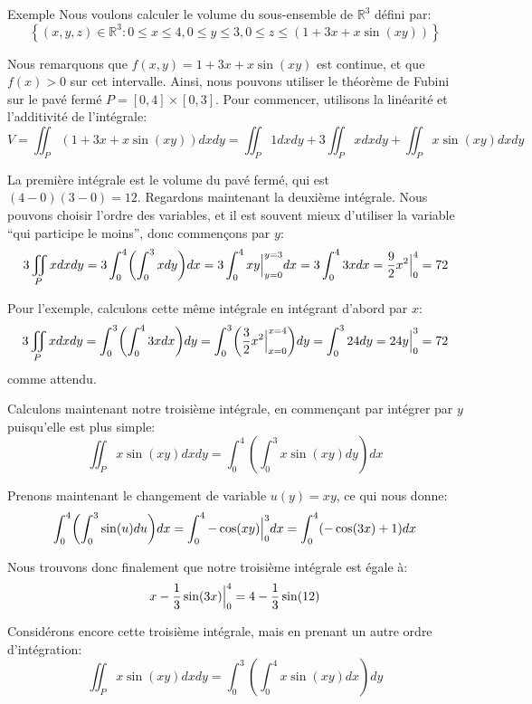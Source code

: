 \documentclass[a4paper]{article}
\begin{document}
\begin{parag}{Exemple}
    Nous voulons calculer le volume du sous-ensemble de $\mathbb{R}^3$ défini par: 
    \[\left\{\left(x, y, z\right) \in \mathbb{R}^3 : 0 \leq x \leq 4, 0 \leq y \leq 3, 0 \leq z \leq \left(1 + 3x + x\sin\left(xy\right)\right)\right\}\]

    Nous remarquons que $f\left(x, y\right) = 1 + 3x + x\sin\left(xy\right)$ est continue, et que $f\left(x\right) > 0$ sur cet intervalle. Ainsi, nous pouvons utiliser le théorème de Fubini sur le pavé fermé $P = \left[0, 4\right] \times \left[0, 3\right]$. Pour commencer, utilisons la linéarité et l'additivité de l'intégrale:
    \[V = \iint_{P} \left(1 + 3x + x\sin\left(xy\right)\right)dxdy = \iint_{P} 1dxdy + 3\iint_{P} xdxdy + \iint_{P} x\sin\left(xy\right) dx dy\]
    
    La première intégrale est le volume du pavé fermé, qui est $\left(4 - 0\right)\left(3 - 0\right) = 12$. Regardons maintenant la deuxième intégrale. Nous pouvons choisir l'ordre des variables, et il est souvent mieux d'utiliser la variable ``qui participe le moins'', donc commençons par $y$: 
    \[3 \iint_{P} xdxdy = 3 \int_{0}^{4} \left(\int_{0}^{3} xdy\right)dx = 3 \int_{0}^{4} xy \eval_{y=0}^{y=3} dx = 3 \int_{0}^{4} 3xdx = \frac{9}{2}x^2 \eval_{0}^{4} = 72\]
    
    Pour l'exemple, calculons cette même intégrale en intégrant d'abord par $x$: 
    \[3 \iint_P xdxdy = \int_{0}^{3} \left(\int_{0}^{4} 3x dx\right)dy = \int_{0}^{3} \left(\frac{3}{2} x^2 \eval_{x=0}^{x=4}\right)dy = \int_{0}^{3} 24dy = 24y \eval_{0}^{3} = 72\]
    comme attendu.
    
    Calculons maintenant notre troisième intégrale, en commençant par intégrer par $y$ puisqu'elle est plus simple:
    \[\iint_{P} x \sin\left(xy\right)dxdy = \int_{0}^{4} \left(\int_{0}^{3} x\sin\left(xy\right)dy\right)dx\]

    Prenons maintenant le changement de variable $u\left(y\right) = xy$, ce qui nous donne:
    \[\int_{0}^{4} \left(\int_{0}^{3} \sin\left(u\right)du\right)dx = \int_{0}^{4} -\cos\left(xy\right) \eval_{0}^{3} dx = \int_{0}^{4} \left(-\cos\left(3x\right) + 1\right)dx\]

    Nous trouvons donc finalement que notre troisième intégrale est égale à:
    \[x - \frac{1}{3}\sin\left(3x\right) \eval_{0}^{4} = 4 - \frac{1}{3} \sin\left(12\right)\]
    
    Considérons encore cette troisième intégrale, mais en prenant un autre ordre d'intégration: 
    \[\iint_P x\sin\left(xy\right)dxdy = \int_{0}^{3} \left(\int_{0}^{4} x\sin\left(xy\right)dx\right)dy\]


\end{parag}
\end{document}

